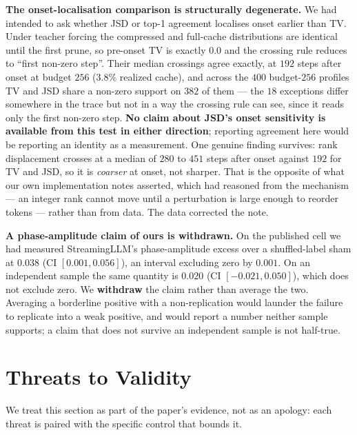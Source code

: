 \documentclass{article}
\begin{document}
\textbf{The onset-localisation comparison is structurally degenerate.} We had
intended to ask whether JSD or top-1 agreement localises onset earlier than TV.
Under teacher forcing the compressed and full-cache distributions are identical
until the first prune, so pre-onset TV is exactly $0.0$ and the crossing rule
reduces to ``first non-zero step''. Their median crossings agree
exactly, at $192$ steps after onset at budget $256$ ($3.8\%$ realized cache),
and across the $400$
budget-$256$ profiles TV and JSD share a non-zero support on $382$ of them ---
the $18$ exceptions differ somewhere in the trace but not in a way the crossing
rule can see, since it reads only the first non-zero step.
\textbf{No claim about JSD's onset sensitivity is available from this test in
either direction}; reporting agreement here would be reporting an identity as a
measurement. One genuine finding survives: rank displacement crosses at a
median of $280$ to $451$ steps after onset against $192$ for TV and JSD, so it
is \emph{coarser} at onset, not sharper. That is the opposite of what our own
implementation notes asserted, which had reasoned from the mechanism --- an
integer rank cannot move until a perturbation is large enough to reorder
tokens --- rather than from data. The data corrected the note.

\textbf{A phase-amplitude claim of ours is withdrawn.} On the published cell we
had measured StreamingLLM's phase-amplitude excess over a shuffled-label sham
at $0.038$ (CI $[0.001, 0.056]$), an interval excluding zero by $0.001$. On an
independent sample the same quantity is $0.020$ (CI $[-0.021, 0.050]$), which
does not exclude zero. We \textbf{withdraw} the claim rather than average the
two. Averaging a borderline positive with a non-replication would launder the
failure to replicate into a weak positive, and would report a number neither
sample supports; a claim that does not survive an independent sample is not
half-true.
\section{Threats to Validity}
\label{sec:threats}

We treat this section as part of the paper's evidence, not as an apology: each threat is paired with the specific control that bounds it.
\end{document}
